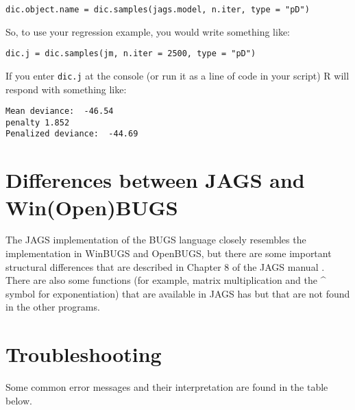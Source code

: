 \documentclass[12pt,english]{article}
\begin{document}
{\begin{Verbatim}
dic.object.name = dic.samples(jags.model, n.iter, type = "pD")
\end{Verbatim}

\noindent So, to use your regression example, you would write something like:

\begin{Verbatim}
dic.j = dic.samples(jm, n.iter = 2500, type = "pD")
\end{Verbatim}

\noindent If you enter \texttt{dic.j} at the console (or run it as a line of code in your script) R will respond with something like:

\begin{Verbatim}
Mean deviance:  -46.54
penalty 1.852
Penalized deviance:  -44.69
\end{Verbatim}

\section{Differences between JAGS and Win(Open)BUGS}

The JAGS implementation of the BUGS language closely resembles the implementation in WinBUGS and OpenBUGS, but there are some important structural differences that are described in Chapter 8 of the JAGS manual \citep{Plummer_mannual}. There are also some functions (for example, matrix multiplication and the \textasciicircum{} symbol for exponentiation) that are available in JAGS has but that are not found in the other programs.

\section{Troubleshooting}

Some common error messages and their interpretation are found in the table below.

}
\end{document}
